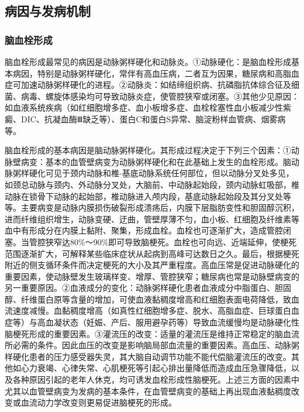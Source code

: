 \subsection{病因与发病机制}

\subsubsection{脑血栓形成}

脑血栓形成最常见的病因是动脉粥样硬化和动脉炎。①动脉硬化：是脑血栓形成基本病因，特别是动脉粥样硬化，常伴有高血压病，二者互为因果，糖尿病和高脂血症可加速动脉粥样硬化的进程。②动脉炎：如结缔组织病、抗磷脂抗体综合征及细菌、病毒、螺旋体感染均可导致动脉炎症，使管腔狭窄或闭塞。③其他少见原因：如血液系统疾病（如红细胞增多症、血小板增多症、血栓栓塞性血小板减少性紫癜、DIC、抗凝血酶Ⅲ缺乏等）、蛋白C和蛋白S异常、脑淀粉样血管病、烟雾病等。

脑血栓形成的基本病因是脑动脉粥样硬化。其形成过程决定于下列三个因素：①动脉壁病变：基本的血管壁病变为动脉粥样硬化和在此基础上发生的血栓形成。脑动脉粥样硬化可见于颈内动脉和椎-基底动脉系统任何部位，但以动脉分叉处多见，如颈总动脉与颈内、外动脉分叉处，大脑前、中动脉起始段，颈内动脉虹吸部，椎动脉在锁骨下动脉的起始部，椎动脉进入颅内段，基底动脉起始段及其分叉处等等。主要病变是动脉内膜损伤破裂形成溃疡后，内膜下层脂肪变性和胆固醇沉积，进而纤维组织增生，动脉变硬、迂曲，管壁厚薄不匀，血小板、红细胞及纤维素等血中有形成分在内膜上黏附、聚集，形成血栓。血栓也可逐渐扩大，造成管腔闭塞。当管腔狭窄达80\%～90\%即可导致脑梗死。血栓也可向远、近端延伸，使梗死范围逐渐扩大，可解释某些临床症状从起病到高峰可达数日之久。最后，根据梗死附近的侧支循环条件而决定梗死的大小及其严重程度。高血压常是促进动脉硬化的重要因素，使动脉壁发生玻璃样变、增厚、管腔狭窄；糖尿病也常是动脉壁病变的另一重要原因。②血液成分的变化：动脉粥样硬化患者血液成分中脂蛋白、胆固醇、纤维蛋白原等含量的增加，可使血液黏稠度增高和红细胞表面电荷降低，致血流速度减慢。血黏稠度增高（如真性红细胞增多症、脱水、高脂血症、巨球蛋白血症等）与高血凝状态（妊娠、产后、服用避孕药等）导致血流缓慢均是动脉硬化性脑梗死形成的重要因素。③灌流压的改变：适量的灌流压是维持正常稳定的脑血流所必需的条件。因此血压的改变是影响脑局部血流量的重要因素。高血压、动脉粥样硬化患者的压力感受器失灵，其大脑自动调节功能不能代偿脑灌流压的改变。其他如心力衰竭、心律失常、心肌梗死等引起心排出量降低而造成血压急骤降低，以及各种原因引起的老年人休克，均可诱发血栓形成性脑梗死。上述三方面的因素中尤其以血管壁病变为发病的基本条件，在血管壁病变的基础上再出现血液黏稠度改变或血流动力学改变则更易促进脑梗死的形成。

